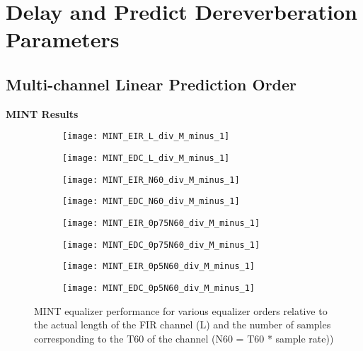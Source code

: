 \chapter{Delay and Predict Dereverberation Parameters}

\section{Multi-channel Linear Prediction Order}

\textbf{MINT Results}

\begin{figure}[H]
	\centering
	\begin{subfigure}[b]{0.4\textwidth}
		\centering
		\texttt{[image: MINT\_EIR\_L\_div\_M\_minus\_1]}
	\end{subfigure}
	\begin{subfigure}[b]{0.4\textwidth}
		\centering
		\texttt{[image: MINT\_EDC\_L\_div\_M\_minus\_1]}
	\end{subfigure}
	\begin{subfigure}[b]{0.4\textwidth}
		\centering
		\texttt{[image: MINT\_EIR\_N60\_div\_M\_minus\_1]}
	\end{subfigure}
	\begin{subfigure}[b]{0.4\textwidth}
		\centering
		\texttt{[image: MINT\_EDC\_N60\_div\_M\_minus\_1]}
	\end{subfigure}
		\begin{subfigure}[b]{0.4\textwidth}
		\centering
		\texttt{[image: MINT\_EIR\_0p75N60\_div\_M\_minus\_1]}
	\end{subfigure}
	\begin{subfigure}[b]{0.4\textwidth}
		\centering
		\texttt{[image: MINT\_EDC\_0p75N60\_div\_M\_minus\_1]}
	\end{subfigure}
   \begin{subfigure}[b]{0.4\textwidth}
		\centering
		\texttt{[image: MINT\_EIR\_0p5N60\_div\_M\_minus\_1]}
	\end{subfigure}
	\begin{subfigure}[b]{0.4\textwidth}
		\centering
		\texttt{[image: MINT\_EDC\_0p5N60\_div\_M\_minus\_1]}
	\end{subfigure}
	\caption{MINT equalizer performance for various equalizer orders relative to the actual length of the FIR channel (L) and the number of samples corresponding to the T60 of the channel (N60 = T60 * sample rate))}
	\label{fig:params_p2_MINT_compare}
\end{figure}

